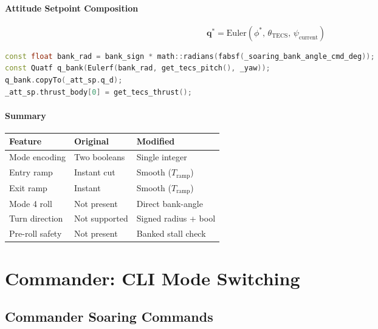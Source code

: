 \documentclass[12pt,a4paper]{report}
\begin{document}
\subsection{Attitude Setpoint Composition}

\begin{equation}
  \mathbf{q}^* = \text{Euler}(\phi^*,\,\theta_{\text{TECS}},\,\psi_{\text{current}})
\end{equation}

\begin{lstlisting}[language=C++]
const float bank_rad = bank_sign * math::radians(fabsf(_soaring_bank_angle_cmd_deg));
const Quatf q_bank(Eulerf(bank_rad, get_tecs_pitch(), _yaw));
q_bank.copyTo(_att_sp.q_d);
_att_sp.thrust_body[0] = get_tecs_thrust();
\end{lstlisting}

\subsection{Summary}

\begin{center}
\begin{tabular}{p{4cm}p{4.5cm}p{4.5cm}}
\toprule
Feature & Original & Modified \\
\midrule
Mode encoding & Two booleans & Single integer \\
Entry ramp & Instant cut & Smooth ($T_{\text{ramp}}$) \\
Exit ramp & Instant & Smooth ($T_{\text{ramp}}$) \\
Mode 4 roll & Not present & Direct bank-angle \\
Turn direction & Not supported & Signed radius + bool \\
Pre-roll safety & Not present & Banked stall check \\
\bottomrule
\end{tabular}
\end{center}

\part{Commander: CLI Mode Switching}

\chapter{Commander Soaring Commands}
\end{document}
